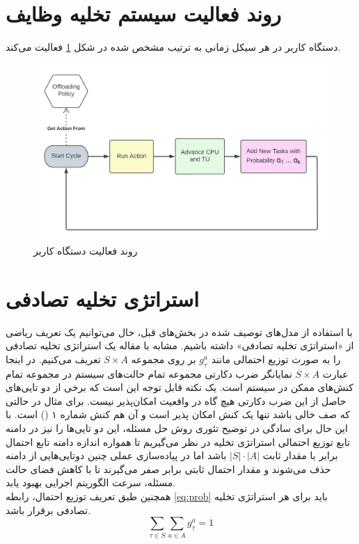 \section{روند فعالیت سیستم تخلیه وظایف}
دستگاه کاربر در هر سیکل زمانی به ترتیب مشخص شده در شکل \ref{fig:ueproc} فعالیت می‌کند.
\begin{figure}[H]
	\centering
	\includegraphics[width=\textwidth]{figures/ueproc.png}
	\caption{روند فعالیت دستگاه کاربر}
	\label{fig:ueproc}
\end{figure}

\section{استراتژی تخلیه تصادفی}
با استفاده از مدل‌های توصیف شده در بخش‌های قبل، حال می‌توانیم یک تعریف ریاضی از «استراتژی تخلیه تصادفی» داشته باشیم. مشابه با مقاله \cite{Liu} یک استراتژی تخلیه تصادفی را به صورت توزیع احتمالی مانند \(g_\tau^a\) بر روی مجموعه \(S \times A\) تعریف می‌کنیم. در اینجا عبارت \(S \times A\) نمایانگر ضرب دکارتی مجموعه تمام حالت‌های سیستم در مجموعه تمام کنش‌های ممکن در سیستم است. یک نکته قابل توجه این است که برخی از دو تایی‌های حاصل از این ضرب دکارتی هیچ گاه در واقعیت امکان‌پذیر نیست. برای مثال در حالتی که صف خالی باشد تنها یک کنش امکان پذیر است و آن هم کنش شماره ۱ () است. با این حال برای سادگی در توضیح تئوری روش حل مسئله، این دو تایی‌ها را نیز در دامنه تابع توزیع احتمالی استراتژی تخلیه در نظر می‌گیریم تا همواره اندازه دامنه تابع احتمال برابر با مقدار ثابت \(|S| \cdot |A|\) باشد اما در پیاده‌سازی عملی چنین دوتایی‌هایی از دامنه حذف می‌شوند و مقدار احتمال ثابتی برابر صفر می‌گیرند تا با کاهش فضای حالت مسئله، سرعت الگوریتم اجرایی بهبود یابد. \\

همچنین طبق تعریف توزیع احتمال، رابطه \ref{eq:prob} باید برای هر استراتژی تخلیه تصادفی برقرار باشد.
\begin{equation}
	\label{eq:prob}
	\sum_{\tau \in S} \sum_{a \in A} g_{\tau}^{a}=1
\end{equation}
\newpage
